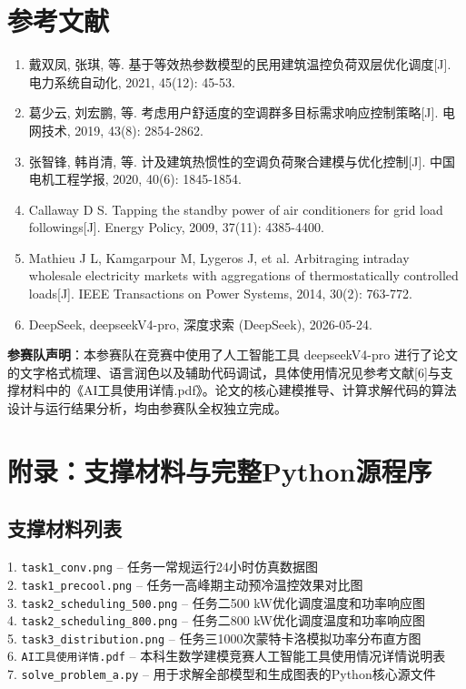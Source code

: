 \documentclass[12pt,a4paper]{article}
\begin{document}
\clearpage
\section*{参考文献}

\begin{enumerate}
    \item 戴双凤, 张琪, 等. 基于等效热参数模型的民用建筑温控负荷双层优化调度[J]. 电力系统自动化, 2021, 45(12): 45-53.
    \item 葛少云, 刘宏鹏, 等. 考虑用户舒适度的空调群多目标需求响应控制策略[J]. 电网技术, 2019, 43(8): 2854-2862.
    \item 张智锋, 韩肖清, 等. 计及建筑热惯性的空调负荷聚合建模与优化控制[J]. 中国电机工程学报, 2020, 40(6): 1845-1854.
    \item Callaway D S. Tapping the standby power of air conditioners for grid load followings[J]. Energy Policy, 2009, 37(11): 4385-4400.
    \item Mathieu J L, Kamgarpour M, Lygeros J, et al. Arbitraging intraday wholesale electricity markets with aggregations of thermostatically controlled loads[J]. IEEE Transactions on Power Systems, 2014, 30(2): 763-772.
    \item DeepSeek, deepseekV4-pro, 深度求索 (DeepSeek), 2026-05-24.
\end{enumerate}

\noindent\textbf{参赛队声明}：本参赛队在竞赛中使用了人工智能工具 deepseekV4-pro 进行了论文的文字格式梳理、语言润色以及辅助代码调试，具体使用情况见参考文献[6]与支撑材料中的《AI工具使用详情.pdf》。论文的核心建模推导、计算求解代码的算法设计与运行结果分析，均由参赛队全权独立完成。

\clearpage
\section*{附录：支撑材料与完整Python源程序}

\subsection*{支撑材料列表}
1. \lstinline!task1_conv.png! -- 任务一常规运行24小时仿真数据图\\
2. \lstinline!task1_precool.png! -- 任务一高峰期主动预冷温控效果对比图\\
3. \lstinline!task2_scheduling_500.png! -- 任务二500 kW优化调度温度和功率响应图\\
4. \lstinline!task2_scheduling_800.png! -- 任务二800 kW优化调度温度和功率响应图\\
5. \lstinline!task3_distribution.png! -- 任务三1000次蒙特卡洛模拟功率分布直方图\\
6. \lstinline!AI工具使用详情.pdf! -- 本科生数学建模竞赛人工智能工具使用情况详情说明表\\
7. \lstinline!solve_problem_a.py! -- 用于求解全部模型和生成图表的Python核心源文件
\end{document}
